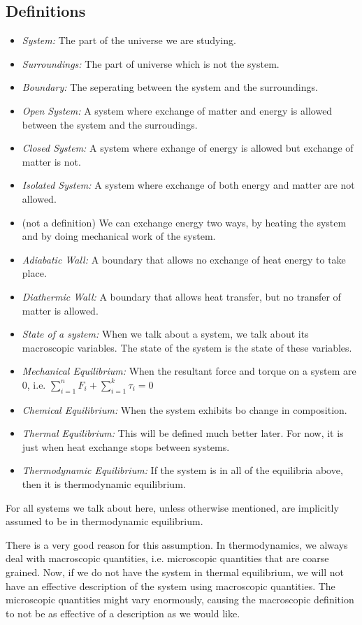 \documentclass[a4paper]{article}
\begin{document}
   \subsection{Definitions}
   \begin{itemize}
       \item \emph{System: } The part of the universe we are studying.
       \item \emph{Surroundings: }The part of universe which is not the system.
       \item \emph{Boundary: }The seperating between the system and the surroundings.
       \item \emph{Open System: }A system where exchange of matter and energy is allowed between the system and the surroudings.
       \item \emph{Closed System: }A system where exhange of energy is allowed but exchange of matter is not.
       \item \emph{Isolated System: }A system where exchange of both energy and matter are not allowed.
       \item (not a definition) We can exchange energy two ways, by heating the system and by doing mechanical work of the system.
       \item \emph{Adiabatic Wall: }A boundary that allows no exchange of heat energy to take place.
       \item \emph{Diathermic Wall: }A boundary that allows heat transfer, but no transfer of matter is allowed.
       \item \emph{State of a system: }When we talk about a system, we talk about its macroscopic variables. The state of the system is the state of these variables.
       \item \emph{Mechanical Equilibrium: }When the resultant force and torque on a system are 0, i.e. \(\sum_{i=1}^{n}F_i + \sum_{i=1}^{k}\tau_i = 0\)
       \item \emph{Chemical Equilibrium: }When the system exhibits bo change in composition.
       \item \emph{Thermal Equilibrium: }This will be defined much better later. For now, it is just when heat exchange stops between systems.
       \item \emph{Thermodynamic Equilibrium: }If the system is in all of the equilibria above, then it is thermodynamic equilibrium.
   \end{itemize}
   \begin{tcolorbox}[colback=blue!5!white,colframe=blue!75!black,arc=0mm,title=Note]
     For all systems we talk about here, unless otherwise mentioned, are implicitly assumed to be in thermodynamic equilibrium.
   \end{tcolorbox}
   There is a very good reason for this assumption. In thermodynamics, we always deal with macroscopic 
   quantities, i.e. microscopic quantities that are coarse grained. Now, if we do not have the system in 
   thermal equilibrium, we will not have an effective description of the system using macroscopic 
   quantities. The microscopic quantities might vary enormously, causing the macroscopic definition to 
   not be as effective of a description as we would like.
\end{document}
